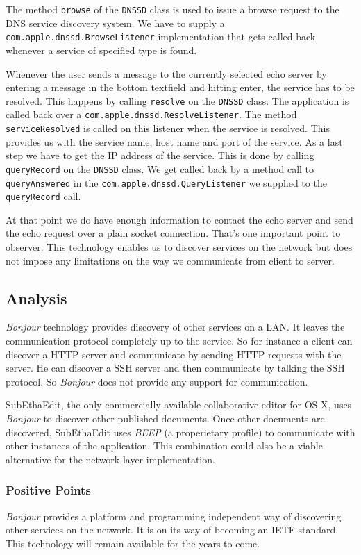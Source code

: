 The method \texttt{browse} of the \texttt{DNSSD} class is used to issue a browse request to the DNS service discovery system. We have to supply a \texttt{com.apple.dnssd.BrowseListener} implementation that gets called back whenever a service of specified type is found.

Whenever the user sends a message to the currently selected echo server by entering a message in the bottom textfield and hitting enter, the service has to be resolved. This happens by calling \texttt{resolve} on the \texttt{DNSSD} class. The application is called back over a \texttt{com.apple.dnssd.ResolveListener}. The method \texttt{serviceResolved} is called on this listener when the service is resolved. This provides us with the service name, host name and port of the service. As a last step we have to get the IP address of the service. This is done by calling \texttt{queryRecord} on the \texttt{DNSSD} class. We get called back by a method call to \texttt{queryAnswered} in the \texttt{com.apple.dnssd.QueryListener} we supplied to the \texttt{queryRecord} call.

At that point we do have enough information to contact the echo server and send the echo request over a plain socket connection. That's one important point to observer. This technology enables us to discover services on the network but does not impose any limitations on the way we communicate from client to server.



\subsection{Analysis}
\emph{Bonjour} technology provides discovery of other services on a LAN. It leaves the communication protocol completely up to the service. So for instance a client can discover a HTTP server and communicate by sending HTTP requests with the server. He can discover a SSH server and then communicate by talking the SSH protocol. So \emph{Bonjour} does not provide any support for communication.

SubEthaEdit, the only commercially available collaborative editor for OS X, uses \emph{Bonjour} to discover other published documents. Once other documents are discovered, SubEthaEdit uses \emph{BEEP} (a properietary profile) to communicate with other instances of the application. This combination could also be a viable alternative for the network layer implementation.

\subsubsection{Positive Points}
\emph{Bonjour} provides a platform and programming independent way of discovering other services on the network. It is on its way of becoming an IETF standard. This technology will remain available for the years to come.

